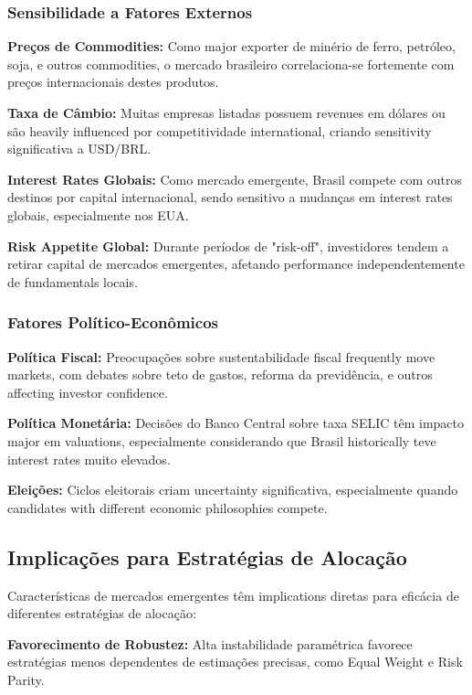 \subsubsection{Sensibilidade a Fatores Externos}

\textbf{Preços de Commodities:} Como major exporter de minério de ferro, petróleo, soja, e outros commodities, o mercado brasileiro correlaciona-se fortemente com preços internacionais destes produtos.

\textbf{Taxa de Câmbio:} Muitas empresas listadas possuem revenues em dólares ou são heavily influenced por competitividade international, criando sensitivity significativa a USD/BRL.

\textbf{Interest Rates Globais:} Como mercado emergente, Brasil compete com outros destinos por capital internacional, sendo sensitivo a mudanças em interest rates globais, especialmente nos EUA.

\textbf{Risk Appetite Global:} Durante períodos de "risk-off", investidores tendem a retirar capital de mercados emergentes, afetando performance independentemente de fundamentals locais.

\subsubsection{Fatores Político-Econômicos}

\textbf{Política Fiscal:} Preocupações sobre sustentabilidade fiscal frequently move markets, com debates sobre teto de gastos, reforma da previdência, e outros affecting investor confidence.

\textbf{Política Monetária:} Decisões do Banco Central sobre taxa SELIC têm impacto major em valuations, especialmente considerando que Brasil historically teve interest rates muito elevados.

\textbf{Eleições:} Ciclos eleitorais criam uncertainty significativa, especialmente quando candidates with different economic philosophies compete.

\subsection{Implicações para Estratégias de Alocação}

Características de mercados emergentes têm implications diretas para eficácia de diferentes estratégias de alocação:

\textbf{Favorecimento de Robustez:} Alta instabilidade paramétrica favorece estratégias menos dependentes de estimações precisas, como Equal Weight e Risk Parity.

